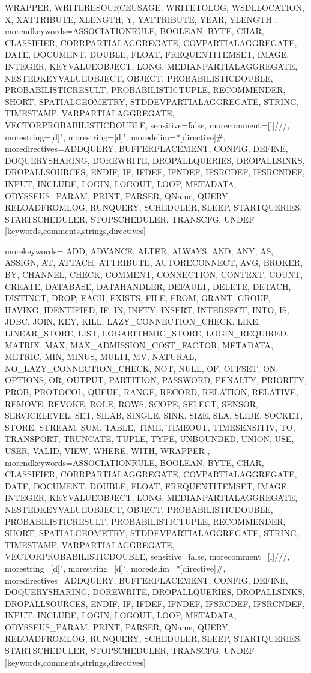 {{WRAPPER, WRITERESOURCEUSAGE, WRITETOLOG, WSDLLOCATION, X, XATTRIBUTE, XLENGTH, Y, YATTRIBUTE, YEAR, YLENGTH%
      },%
   morendkeywords={ASSOCIATIONRULE, BOOLEAN, BYTE, CHAR, CLASSIFIER, CORRPARTIALAGGREGATE, COVPARTIALAGGREGATE, DATE, DOCUMENT, DOUBLE, FLOAT, FREQUENTITEMSET, IMAGE, INTEGER, KEYVALUEOBJECT, LONG, MEDIANPARTIALAGGREGATE, NESTEDKEYVALUEOBJECT, OBJECT, PROBABILISTICDOUBLE, PROBABILISTICRESULT, PROBABILISTICTUPLE, RECOMMENDER, SHORT, SPATIALGEOMETRY, STDDEVPARTIALAGGREGATE, STRING, TIMESTAMP, VARPARTIALAGGREGATE, VECTORPROBABILISTICDOUBLE},%
   sensitive=false,
   morecomment=[l]///,%
   morestring=[d]",%
   morestring=[d]',%
   moredelim=*[directive]\#,%
   moredirectives={ADDQUERY, BUFFERPLACEMENT, CONFIG, DEFINE, DOQUERYSHARING, DOREWRITE, DROPALLQUERIES, DROPALLSINKS, DROPALLSOURCES, ENDIF, IF, IFDEF, IFNDEF, IFSRCDEF, IFSRCNDEF, INPUT, INCLUDE, LOGIN, LOGOUT, LOOP, METADATA, ODYSSEUS_PARAM, PRINT, PARSER, QName, QUERY, RELOADFROMLOG, RUNQUERY, SCHEDULER, SLEEP, STARTQUERIES, STARTSCHEDULER, STOPSCHEDULER, TRANSCFG, UNDEF}%
}[keywords,comments,strings,directives]

%
   {morekeywords={%
ADD, ADVANCE, ALTER, ALWAYS, AND, ANY, AS, ASSIGN, AT, ATTACH, ATTRIBUTE, AUTORECONNECT, AVG, BROKER, BY, CHANNEL, CHECK, COMMENT, CONNECTION, CONTEXT, COUNT, CREATE, DATABASE, DATAHANDLER, DEFAULT, DELETE, DETACH, DISTINCT, DROP, EACH, EXISTS, FILE, FROM, GRANT, GROUP, HAVING, IDENTIFIED, IF, IN, INFTY, INSERT, INTERSECT, INTO, IS, JDBC, JOIN, KEY, KILL, LAZY_CONNECTION_CHECK, LIKE, LINEAR_STORE, LIST, LOGARITHMIC_STORE, LOGIN_REQUIRED, MATRIX, MAX, MAX_ADMISSION_COST_FACTOR, METADATA, METRIC, MIN, MINUS, MULTI, MV, NATURAL, NO_LAZY_CONNECTION_CHECK, NOT, NULL, OF, OFFSET, ON, OPTIONS, OR, OUTPUT, PARTITION, PASSWORD, PENALTY, PRIORITY, PROB, PROTOCOL, QUEUE, RANGE, RECORD, RELATION, RELATIVE, REMOVE, REVOKE, ROLE, ROWS, SCOPE, SELECT, SENSOR, SERVICELEVEL, SET, SILAB, SINGLE, SINK, SIZE, SLA, SLIDE, SOCKET, STORE, STREAM, SUM, TABLE, TIME, TIMEOUT, TIMESENSITIV, TO, TRANSPORT, TRUNCATE, TUPLE, TYPE, UNBOUNDED, UNION, USE, USER, VALID, VIEW, WHERE, WITH, WRAPPER%
      },%
   morendkeywords={ASSOCIATIONRULE, BOOLEAN, BYTE, CHAR, CLASSIFIER, CORRPARTIALAGGREGATE, COVPARTIALAGGREGATE, DATE, DOCUMENT, DOUBLE, FLOAT, FREQUENTITEMSET, IMAGE, INTEGER, KEYVALUEOBJECT, LONG, MEDIANPARTIALAGGREGATE, NESTEDKEYVALUEOBJECT, OBJECT, PROBABILISTICDOUBLE, PROBABILISTICRESULT, PROBABILISTICTUPLE, RECOMMENDER, SHORT, SPATIALGEOMETRY, STDDEVPARTIALAGGREGATE, STRING, TIMESTAMP, VARPARTIALAGGREGATE, VECTORPROBABILISTICDOUBLE},%
   sensitive=false,
   morecomment=[l]///,%
   morestring=[d]",%
   morestring=[d]',%
   moredelim=*[directive]\#,%
   moredirectives={ADDQUERY, BUFFERPLACEMENT, CONFIG, DEFINE, DOQUERYSHARING, DOREWRITE, DROPALLQUERIES, DROPALLSINKS, DROPALLSOURCES, ENDIF, IF, IFDEF, IFNDEF, IFSRCDEF, IFSRCNDEF, INPUT, INCLUDE, LOGIN, LOGOUT, LOOP, METADATA, ODYSSEUS_PARAM, PRINT, PARSER, QName, QUERY, RELOADFROMLOG, RUNQUERY, SCHEDULER, SLEEP, STARTQUERIES, STARTSCHEDULER, STOPSCHEDULER, TRANSCFG, UNDEF}%
}[keywords,comments,strings,directives]

